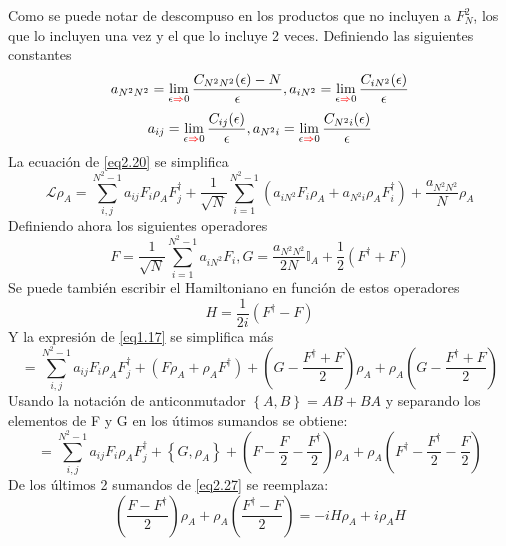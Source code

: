 \documentclass{book}
\begin{document}
Como se puede notar de descompuso en los productos que no incluyen a $F_N^2$, los que lo incluyen una vez y el que lo incluye 2 veces. Definiendo las siguientes constantes
\begin{equation}\label{eq2.21} a_{N^2N^2}=\lim\limits_{\epsilon\textcolor{red}{\Rightarrow} 0}\frac{C_{N^2N^2}(\epsilon)-N}{\epsilon}, a_{iN^2}=\lim\limits_{\epsilon\textcolor{red}{\Rightarrow} 0}\frac{C_{iN^2}(\epsilon)}{\epsilon} \end{equation}
\begin{equation}\label{eq2.22} a_{ij}=\lim\limits_{\epsilon\textcolor{red}{\Rightarrow} 0}\frac{C_{ij}(\epsilon)}{\epsilon}, a_{ N^2 i}=\lim\limits_{\epsilon\textcolor{red}{\Rightarrow} 0}\frac{C_{N^2 i}(\epsilon)}{\epsilon} \end{equation}
La ecuación de \textcolor{blue}{\ref{eq2.20}} se simplifica
\begin{equation}\label{eq2.23}\mathcal{L}\rho_A=\sum_{i,j}^{N^2-1}a_{ij}F_i\rho_AF_j^\dag+\frac{1}{\sqrt{N}}\sum_{i=1}^{N^2-1}(a_{iN^2}F_i\rho_A+a_{N^2i}\rho_AF_i^\dag)+\frac{a_{N^2N^2}}{N}\rho_A\end{equation}
Definiendo ahora los siguientes operadores
\begin{equation}\label{eq2.24} F=\frac{1}{\sqrt{N}}\sum_{i=1}^{N^2-1}a_{iN^2}F_i, G=\frac{a_{N^2N^2}}{2N}\mathbb{I}_A+\frac{1}{2}(F^\dag+F)\end{equation}
Se puede también escribir el Hamiltoniano en función de estos operadores
\begin{equation}\label{eq2.25}  H=\frac{1}{2i}(F^\dag-F)\end{equation}
Y la expresión de \textcolor{blue}{\ref{eq1.17}} se simplifica más
\begin{equation}\label{eq2.26} =\sum_{i,j}^{N^2-1}a_{ij}F_i\rho_AF_j^\dag+(F\rho_A+\rho_AF^\dag)+(G-\frac{F^\dag+F}{2})\rho_A+\rho_A(G-\frac{F^\dag+F}{2})\end{equation}
Usando la notación de anticonmutador $\left\{A,B\right\}=AB+BA$ y separando los elementos de F y G en los útimos sumandos se obtiene:
\begin{equation}\label{eq2.27}=\sum_{i,j}^{N^2-1}a_{ij}F_i\rho_A F_j^\dag+\left\{G,\rho_A\right\}+(F-\frac{F}{2}-\frac{F^\dag}{2})\rho_A+\rho_A(F^\dag-\frac{F^\dag}{2}-\frac{F}{2})\end{equation}
De los últimos 2 sumandos de \textcolor{blue}{\ref{eq2.27}} se reemplaza:
\begin{equation}\label{eq2.28} (\frac{F-F^\dag}{2})\rho_A+\rho_A(\frac{F^\dag-F}{2})=-iH\rho_A+i\rho_AH\end{equation}
\end{document}
